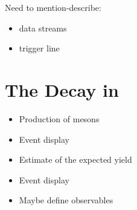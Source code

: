 Need to mention-describe:
\begin{itemize}
  \item data streams
  \item trigger line
\end{itemize}

\section{The \BJpsiKst Decay in \lhcb}

\begin{itemize}
  \item Production of \Bs mesons
  \item Event display
  \item Estimate of the expected yield
  \item Event display
  \item Maybe define observables
\end{itemize}
